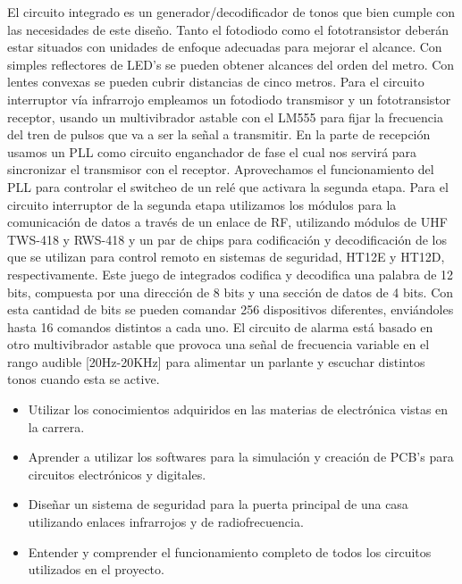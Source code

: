 \documentclass[a4paper,11pt]{article}
\begin{document}
El circuito integrado es un generador/decodificador de tonos que bien cumple con las necesidades de este diseño. Tanto el fotodiodo como el fototransistor deberán estar situados con unidades de enfoque adecuadas para mejorar el alcance. Con simples reflectores de LED's se pueden obtener alcances del orden del metro. Con lentes convexas se pueden cubrir distancias de cinco metros. 
Para el circuito interruptor vía infrarrojo empleamos un fotodiodo transmisor y un fototransistor receptor, usando un multivibrador astable con el LM555 para fijar la frecuencia del tren de pulsos que va a ser la señal a transmitir. En la parte de recepción usamos un PLL como circuito enganchador de fase el cual nos servirá para sincronizar el transmisor con el receptor. Aprovechamos el funcionamiento del PLL para controlar el switcheo de un relé que activara la segunda etapa.
Para el circuito interruptor de la segunda etapa utilizamos los módulos para la comunicación de datos a través de un enlace de RF, utilizando módulos de UHF TWS-418 y RWS-418 y un par de chips para codificación y decodificación de los que se utilizan para control remoto en sistemas de seguridad, HT12E y HT12D, respectivamente. Este juego de integrados codifica y decodifica una palabra de 12 bits, compuesta por una dirección de 8 bits y una sección de datos de 4 bits. Con esta cantidad de bits se pueden comandar 256 dispositivos diferentes, enviándoles hasta 16 comandos distintos a cada uno.
El circuito de alarma está basado en otro multivibrador astable que provoca una señal de frecuencia variable en el rango audible [20Hz-20KHz] para alimentar un parlante y escuchar distintos tonos cuando esta se active.  

\begin{itemize}
	\item Utilizar los conocimientos adquiridos en las materias de electrónica vistas en la carrera.
	\item Aprender a utilizar los softwares para la simulación y creación de PCB’s para circuitos electrónicos y digitales.
	\item Diseñar un sistema de seguridad para la puerta principal de una casa utilizando enlaces infrarrojos y de radiofrecuencia.
	\item Entender y comprender el funcionamiento completo de todos los circuitos utilizados en el proyecto.
	
	
\end{itemize}
\end{document}
